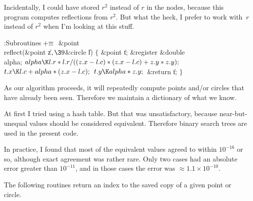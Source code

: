 Incidentally, I could have stored $r^2$ instead of $r$ in the
 nodes, because this program computes reflections from
$r^2$. But what the heck, I prefer to work with~$r$ instead of
$r^2$ when I'm looking at this stuff.

\Y\B\4:Subroutines\X${}\mathrel+\equiv{}$\6
\&{point} \\{reflect}(\&{point} \|z${},\39{}$\&{circle} \|l)\1\1\2\2\6
${}\{{}$\1\6
\&{point} \|t;\6
\&{register} \&{double} \\{alpha};\7
${}\\{alpha}\K\|l.\|r*\|l.\|r/((\|z.\|x-\|l.\|c)*(\|z.\|x-\|l.\|c)+\|z.\|y*\|z.%
\|y);{}$\6
${}\|t.\|x\K\|l.\|c+\\{alpha}*(\|z.\|x-\|l.\|c);{}$\6
${}\|t.\|y\K\\{alpha}*\|z.\|y;{}$\6
\&{return} \|t;\6
\4${}\}{}$\2\par
\fi

As our algorithm proceeds, it will repeatedly compute points
and/or circles that have already been seen. Therefore we maintain
a dictionary of what we know.

At first I tried using a hash table. But that was unsatisfactory,
because near-but-unequal values should be considered equivalent.
Therefore binary search trees are used in the present code.

In practice, I found that most of the equivalent values agreed to
within $10^{-16}$ or so, although exact agreement was rather rare.
Only two cases had an absolute error greater than $10^{-11}$, and
in those cases the error was $\approx 1.1\times10^{-10}$.

The following routines return an index to the saved copy of
a given point or circle.

